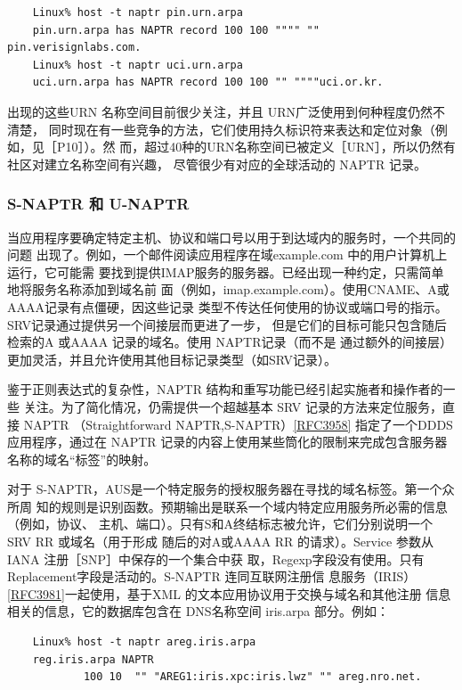 \begin{verbatim}
    Linux% host -t naptr pin.urn.arpa
    pin.urn.arpa has NAPTR record 100 100 """" "" pin.verisignlabs.com.
    Linux% host -t naptr uci.urn.arpa
    uci.urn.arpa has NAPTR record 100 100 "" """"uci.or.kr.
\end{verbatim}

出现的这些URN 名称空间目前很少关注，并且 URN广泛使用到何种程度仍然不清楚，
同时现在有一些竞争的方法，它们使用持久标识符来表达和定位对象（例如，见［P10］）。然
而，超过40种的URN名称空间已被定义［URN］，所以仍然有社区对建立名称空间有兴趣，
尽管很少有对应的全球活动的 NAPTR 记录。

\subsubsection{S-NAPTR 和 U-NAPTR}

当应用程序要确定特定主机、协议和端口号以用于到达域内的服务时，一个共同的问题
出现了。例如，一个邮件阅读应用程序在域example.com 中的用户计算机上运行，它可能需
要找到提供IMAP服务的服务器。已经出现一种约定，只需简单地将服务名称添加到域名前
面（例如，imap.example.com）。使用CNAME、A或AAAA记录有点僵硬，因这些记录
类型不传达任何使用的协议或端口号的指示。SRV记录通过提供另一个间接层而更进了一步，
但是它们的目标可能只包含随后检索的A 或AAAA 记录的域名。使用 NAPTR记录（而不是
通过额外的间接层）更加灵活，并且允许使用其他目标记录类型（如SRV记录）。

鉴于正则表达式的复杂性，NAPTR 结构和重写功能已经引起实施者和操作者的一些
关注。为了简化情况，仍需提供一个超越基本 SRV 记录的方法来定位服务，直接 NAPTR
（Straightforward
NAPTR,S-NAPTR）\href{https://www.rfc-editor.org/rfc/rfc3958}{[RFC3958]}
指定了一个DDDS应用程序，通过在
NAPTR 记录的内容上使用某些筒化的限制来完成包含服务器名称的域名“标签”的映射。

对于 S-NAPTR，AUS是一个特定服务的授权服务器在寻找的域名标签。第一个众所周
知的规则是识别函数。预期输出是联系一个域内特定应用服务所必需的信息（例如，协议、
主机、端口）。只有S和A终结标志被允许，它们分别说明一个 SRV RR 或域名（用于形成
随后的对A或AAAA RR 的请求）。Service 参数从IANA 注册［SNP］中保存的一个集合中获
取，Regexp字段没有使用。只有 Replacement字段是活动的。S-NAPTR 连同互联网注册信
息服务（IRIS）\href{https://www.rfc-editor.org/rfc/rfc3981}{[RFC3981]}一起使用，基于XML
的文本应用协议用于交换与域名和其他注册
信息相关的信息，它的数据库包含在 DNS名称空间 iris.arpa 部分。例如：
\begin{verbatim}
    Linux% host -t naptr areg.iris.arpa
    reg.iris.arpa NAPTR
            100 10  "" "AREG1:iris.xpc:iris.lwz" "" areg.nro.net.
\end{verbatim}

